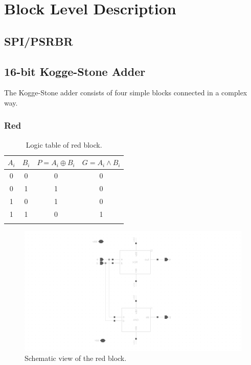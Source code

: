 \section{Block Level Description}

\subsection{SPI/PSRBR}

\subsection{16-bit Kogge-Stone Adder}
The Kogge-Stone adder consists of four simple blocks connected in a complex way.

\noindent {}

\subsubsection{Red}

\begin{table}[H]
  \caption{Logic table of red block.}
  \centering
  \begin{tabular}{cc|cc}
    \toprule
    $A_i$ & $B_i$ & $P=A_i \oplus B_i$ & $G=A_i \wedge B_i$ \\
    \midrule
    0 & 0 & 0 & 0 \\
    0 & 1 & 1 & 0 \\
    1 & 0 & 1 & 0 \\
    1 & 1 & 0 & 1 \\
    \bottomrule
    \label{tab:red}
  \end{tabular}
\end{table}

\begin{figure}[H]
  \centering
  \captionsetup{justification=centering}
  \includegraphics[clip,width=1.0\textwidth]{../figures/red}
  \caption{Schematic view of the red block.} \label{fig:red}
\end{figure}

